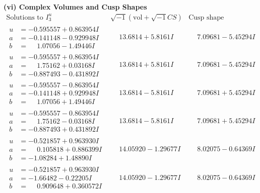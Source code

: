\documentclass[1p]{elsarticle_modified}
\theoremstyle{definition}
\newcommand{\I}{\sqrt{-1}}
\begin{document}
\newpage\flushleft \textbf{(vi) Complex Volumes and Cusp Shapes}
$$\begin{array}{c|c|c}  
\text{Solutions to }I^u_{3}& \I (\text{vol} + \sqrt{-1}CS) & \text{Cusp shape}\\
 \hline 
\begin{aligned}
u &= -0.595557 + 0.863954 I \\
a &= -0.141148 - 0.929948 I \\
b &= \phantom{-}1.07056 - 1.49446 I\end{aligned}
 & \phantom{-}13.6814 + 5.8161 I & \phantom{-}7.09681 - 5.45294 I \\ \hline\begin{aligned}
u &= -0.595557 + 0.863954 I \\
a &= \phantom{-}1.75162 + 0.03168 I \\
b &= -0.887493 - 0.431892 I\end{aligned}
 & \phantom{-}13.6814 + 5.8161 I & \phantom{-}7.09681 - 5.45294 I \\ \hline\begin{aligned}
u &= -0.595557 - 0.863954 I \\
a &= -0.141148 + 0.929948 I \\
b &= \phantom{-}1.07056 + 1.49446 I\end{aligned}
 & \phantom{-}13.6814 - 5.8161 I & \phantom{-}7.09681 + 5.45294 I \\ \hline\begin{aligned}
u &= -0.595557 - 0.863954 I \\
a &= \phantom{-}1.75162 - 0.03168 I \\
b &= -0.887493 + 0.431892 I\end{aligned}
 & \phantom{-}13.6814 - 5.8161 I & \phantom{-}7.09681 + 5.45294 I \\ \hline\begin{aligned}
u &= -0.521857 + 0.963930 I \\
a &= \phantom{-}0.105818 + 0.886399 I \\
b &= -1.08284 + 1.48890 I\end{aligned}
 & \phantom{-}14.05920 - 1.29677 I & \phantom{-}8.02075 - 0.64369 I \\ \hline\begin{aligned}
u &= -0.521857 + 0.963930 I \\
a &= -1.66482 - 0.22205 I \\
b &= \phantom{-}0.909648 + 0.360572 I\end{aligned}
 & \phantom{-}14.05920 - 1.29677 I & \phantom{-}8.02075 - 0.64369 I \\ \hline\begin{aligned}

\end{aligned}
\end{array}$$
\end{document}

